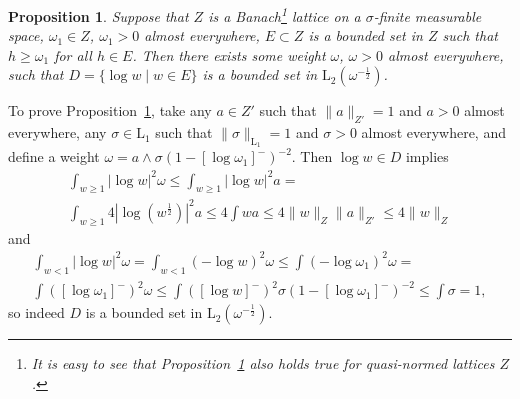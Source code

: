 \documentclass[12pt]{amsart}
\newtheorem {proposition} [theorem] {Proposition}
\newcommand {\lclass} [2] {\ensuremath{\mathrm L_{#1} \left( #2 \right) }}
\newcommand {\lclassg} [1] {\ensuremath{\mathrm L_{#1}}}
\newcommand {\weightw} {\ensuremath {\mathit w}}
\begin{document}
\begin {proposition}
\label {wambspace}
Suppose that $Z$ is a Banach\footnote {It is easy to see that Proposition~\ref {wambspace} also holds true for
quasi-normed lattices $Z$.}
lattice on a $\sigma$-finite measurable space,
$\omega_1 \in Z$, $\omega_1 > 0$ almost everywhere,
$E \subset Z$ is a bounded set in $Z$ such that $h \geqslant \omega_1$ for all $h \in E$.
Then there exists some weight $\omega$, $\omega > 0$ almost everywhere, such that
$D = \{\log \weightw \mid \weightw \in E\}$ is a bounded set in $\lclass {2} {\omega^{-\frac 1 2}}$.
\end {proposition}
To prove Proposition~\ref {wambspace}, take any $a \in Z'$ such that $\|a\|_{Z'} = 1$ and $a > 0$ almost everywhere, any
$\sigma \in \lclassg {1}$ such that $\|\sigma\|_{\lclassg {1}} = 1$ and $\sigma > 0$ almost everywhere, and
define a weight $\omega = a \wedge \sigma (1 - [\log \omega_1]^-)^{-2}$.
Then $\log \weightw \in D$ implies
\begin {multline*}
\int_{\weightw \geqslant 1} |\log \weightw|^2 \omega \leqslant \int_{\weightw \geqslant 1} |\log \weightw|^2 a
=
\\
\int_{\weightw \geqslant 1} 4 \left|\log \left(\weightw^{\frac 1 2}\right)\right|^2 a \leqslant
4 \int \weightw a \leqslant 4 \|\weightw\|_Z \|a\|_{Z'}  \leqslant 4 \|\weightw\|_Z
\end {multline*}
and
\begin {multline*}
\int_{\weightw < 1} |\log \weightw|^2 \omega = \int_{\weightw < 1} (-\log \weightw)^2 \omega \leqslant
\int (-\log \omega_1)^2 \omega =
\\
\int ([\log \omega_1]^-)^2 \omega 
\leqslant
\int ([\log \weightw]^-)^2 \sigma (1 - [\log \omega_1]^-)^{-2}
\leqslant \int \sigma = 1,
\end {multline*}
so indeed $D$ is a bounded set in $\lclass {2} {\omega^{-\frac 1 2}}$.
\end{document}
